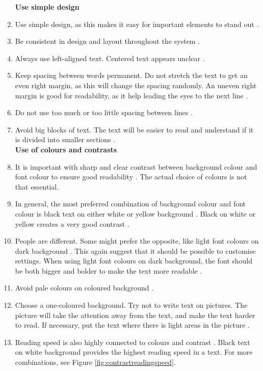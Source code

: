 \begin{enumerate}[{g}.1]
\textbf{Use simple design}

\item Use simple design, as this makes it easy for important elements to stand out \cite{actionforblindpeopleTekst}.
\item Be consistent in design and layout throughout the system \cite{actionforblindpeopleTekst}.
\item Always use left-aligned text. Centered text appears unclear \cite{actionforblindpeopleTekst}.  
\item Keep spacing between words permanent. Do not stretch the text to get an even right margin, as this will change the spacing randomly. An uneven right margin is good for readability, as it help leading the eyes to the next line \cite{blindeforbundetTekst} \cite{actionforblindpeopleTekst}.
\item Do not use too much or too little spacing between lines \cite{blindeforbundetTekst} \cite{actionforblindpeopleTekst}. 
\item Avoid big blocks of text. The text will be easier to read and understand if it is divided into smaller sections \cite{blindeforbundetTekst} \cite{actionforblindpeopleTekst}. \\  


\textbf{Use of colours and contrasts}
\item It is important with sharp and clear contrast between background colour and font colour to ensure good readability \cite{blindeforbundetTekst} \cite{actionforblindpeopleTekst}. The actual choice of colours is not that essential.   
\item In general, the most preferred combination of background colour and font colour is black text on either white or yellow background \cite{actionforblindpeopleTekst}. Black on white or yellow creates a very good contrast \cite{blindeforbundetTekst}. 
\item People are different. Some might prefer the opposite, like light font colours on dark background \cite{blindeforbundetTekst}. This again suggest that it should be possible to customise settings. When using light font colours on dark background, the font should be both bigger and bolder to make the text more readable \cite{actionforblindpeopleTekst}.
\item Avoid pale colours on coloured background \cite{blindeforbundetTekst}.  
\item Choose a one-coloured background. Try not to write text on pictures. The picture will take the attention away from the text, and make the text harder to read. If necessary, put the text where there is light areas in the picture  \cite{blindeforbundetTekst}.  
\item Reading speed is also highly connected to colours and contrast  \cite{blindeforbundetTekst}. Black text on white background provides the highest reading speed in a text. For more combinations, see Figure \ref{fig:contrastreadingspeed}.


\end{enumerate}
